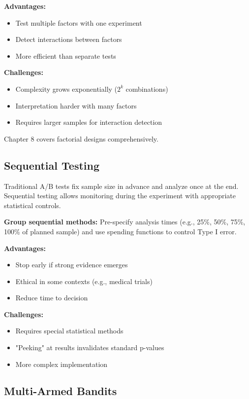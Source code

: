 \textbf{Advantages:}
\begin{itemize}
    \item Test multiple factors with one experiment
    \item Detect interactions between factors
    \item More efficient than separate tests
\end{itemize}

\textbf{Challenges:}
\begin{itemize}
    \item Complexity grows exponentially ($2^k$ combinations)
    \item Interpretation harder with many factors
    \item Requires larger samples for interaction detection
\end{itemize}

Chapter 8 covers factorial designs comprehensively.

\subsection{Sequential Testing}

Traditional A/B tests fix sample size in advance and analyze once at the end. Sequential testing allows monitoring during the experiment with appropriate statistical controls.

\textbf{Group sequential methods:} Pre-specify analysis times (e.g., 25\%, 50\%, 75\%, 100\% of planned sample) and use spending functions to control Type I error.

\textbf{Advantages:}
\begin{itemize}
    \item Stop early if strong evidence emerges
    \item Ethical in some contexts (e.g., medical trials)
    \item Reduce time to decision
\end{itemize}

\textbf{Challenges:}
\begin{itemize}
    \item Requires special statistical methods
    \item "Peeking" at results invalidates standard p-values
    \item More complex implementation
\end{itemize}

\subsection{Multi-Armed Bandits}


